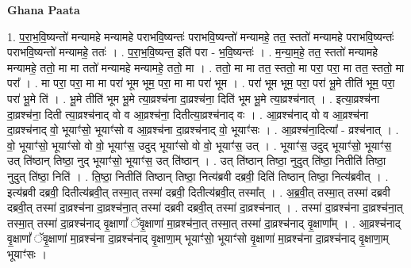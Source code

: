 \documentclass[17pt]{extarticle}
\begin{document}
\textbf{Ghana Paata } \newline

1. प॒रा॒भ॒वि॒ष्यन्तो॑ मन्यामहे मन्यामहे पराभवि॒ष्यन्तः॑ पराभवि॒ष्यन्तो॑ मन्यामहे॒ तत॒ स्ततो॑ मन्यामहे पराभवि॒ष्यन्तः॑ पराभवि॒ष्यन्तो॑ मन्यामहे॒ ततः॑ । . प॒रा॒भ॒वि॒ष्यन्त॒ इति॑ परा - भ॒वि॒ष्यन्तः॑ । . म॒न्या॒म॒हे॒ तत॒ स्ततो॑ मन्यामहे मन्यामहे॒ ततो॒ मा मा ततो॑ मन्यामहे मन्यामहे॒ ततो॒ मा । . ततो॒ मा मा तत॒ स्ततो॒ मा परा॒ परा॒ मा तत॒ स्ततो॒ मा परा᳚ । . मा परा॒ परा॒ मा मा परा॑ भूम भूम॒ परा॒ मा मा परा॑ भूम । . परा॑ भूम भूम॒ परा॒ परा॑ भू॒मे तीति॑ भूम॒ परा॒ परा॑ भू॒मे ति॑ । . भू॒मे तीति॑ भूम भू॒मे त्या॒व्रश्च॑ना दा॒व्रश्च॑ना॒ दिति॑ भूम भू॒मे त्या॒व्रश्च॑नात् । . इत्या॒व्रश्च॑ना दा॒व्रश्च॑ना॒ दिती त्या॒व्रश्च॑नाद् वो व आ॒व्रश्च॑ना॒ दितीत्या॒व्रश्च॑नाद् वः । . आ॒व्रश्च॑नाद् वो व आ॒व्रश्च॑ना दा॒व्रश्च॑नाद् वो॒ भूयाꣳ॑सो॒ भूयाꣳ॑सो व आ॒व्रश्च॑ना दा॒व्रश्च॑नाद् वो॒ भूयाꣳ॑सः । . आ॒व्रश्च॑ना॒दित्या᳚ - व्रश्च॑नात् । . वो॒ भूयाꣳ॑सो॒ भूयाꣳ॑सो वो वो॒ भूयाꣳ॑स॒ उदुद् भूयाꣳ॑सो वो वो॒ भूयाꣳ॑स॒ उत् । . भूयाꣳ॑स॒ उदुद् भूयाꣳ॑सो॒ भूयाꣳ॑स॒ उत् ति॑ष्ठान् तिष्ठा॒ नुद् भूयाꣳ॑सो॒ भूयाꣳ॑स॒ उत् ति॑ष्ठान् । . उत् ति॑ष्ठान् तिष्ठा॒ नुदुत् ति॑ष्ठा॒ नितीति॑ तिष्ठा॒ नुदुत् ति॑ष्ठा॒ निति॑ । . ति॒ष्ठा॒ नितीति॑ तिष्ठान् तिष्ठा॒ नित्य॑ब्रवी दब्रवी॒ दिति॑ तिष्ठान् तिष्ठा॒ नित्य॑ब्रवीत् । . इत्य॑ब्रवी दब्रवी॒ दितीत्य॑ब्रवी॒त् तस्मा॒त् तस्मा॑ दब्रवी॒ दितीत्य॑ब्रवी॒त् तस्मा᳚त् । . अ॒ब्र॒वी॒त् तस्मा॒त् तस्मा॑ दब्रवी दब्रवी॒त् तस्मा॑ दा॒व्रश्च॑ना दा॒व्रश्च॑ना॒त् तस्मा॑ दब्रवी दब्रवी॒त् तस्मा॑ दा॒व्रश्च॑नात् । . तस्मा॑ दा॒व्रश्च॑ना दा॒व्रश्च॑ना॒त् तस्मा॒त् तस्मा॑ दा॒व्रश्च॑नाद् वृ॒क्षाणां᳚ ॅवृ॒क्षाणा॑ मा॒व्रश्च॑ना॒त् तस्मा॒त् तस्मा॑ दा॒व्रश्च॑नाद् वृ॒क्षाणा᳚म् । . आ॒व्रश्च॑नाद् वृ॒क्षाणां᳚ ॅवृ॒क्षाणा॑ मा॒व्रश्च॑ना दा॒व्रश्च॑नाद् वृ॒क्षाणा॒म् भूयाꣳ॑सो॒ भूयाꣳ॑सो वृ॒क्षाणा॑ मा॒व्रश्च॑ना दा॒व्रश्च॑नाद् वृ॒क्षाणा॒म् भूयाꣳ॑सः । \newline
\end{document}
